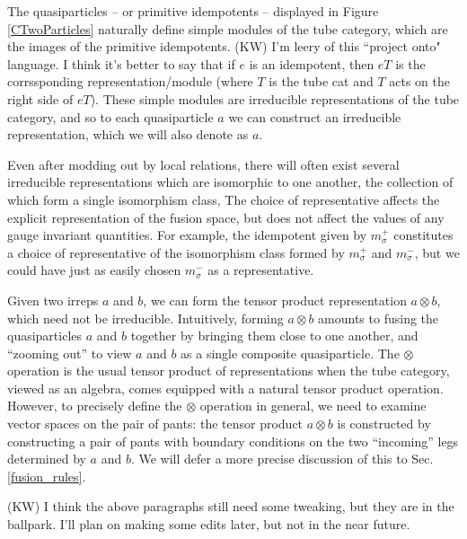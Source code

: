 \documentclass[12pt,a4paper]{article}
\newcommand{\tp}{\otimes}
\newcommand{\kw}[1]{{\color{kwcolor}\footnotesize{(KW) #1}}}
\begin{document}
The quasiparticles -- or primitive idempotents -- displayed in Figure \ref{CTwoParticles} naturally define simple modules of the tube category, which are the images of the primitive idempotents.
\kw{I'm leery of this ``project onto" language.
I think it's better to say that if $e$ is an idempotent, then $eT$ is the corrssponding
representation/module (where $T$ is the tube cat and $T$ acts on the right side of $eT$).}
These simple modules are irreducible representations 
of the tube category, and so to each quasiparticle $a$ we can construct an irreducible representation, which we will also denote as $a$. 

Even after modding out by local relations, there will often exist several irreducible representations which are isomorphic to one another, the collection of which form a single isomorphism class, 
The choice of representative affects the explicit representation of the fusion space, but does not affect the values of any gauge invariant quantities. 
For example, the idempotent given by ${m_\sigma^+}$ constitutes a choice of representative of the isomorphism class formed by $m_\sigma^+$ and $m_\sigma^-$, but we could have just as easily chosen ${m_\sigma^-}$ as a representative.

Given two irreps $a$ and $b$, we can form the tensor product representation $a\tp b$, which need not be irreducible.
Intuitively, forming $a\tp b$ amounts to fusing the quasiparticles $a$ and $b$ together by bringing them close to one another, and ``zooming out'' to view $a$ and $b$ as a single composite quasiparticle. 
The $\tp$ operation is the usual tensor product of representations when the tube category, viewed as an algebra, comes equipped with a natural tensor product operation. 
However, to precisely define the $\tp$ operation in general, we need to examine vector spaces on the pair of pants: the tensor product $a \tp b$ is constructed by constructing a pair of pants with 
boundary conditions on the two ``incoming'' legs determined by $a$ and $b$.
We will defer a more precise discussion of this to Sec. \ref{fusion_rules}. 

\kw{I think the above paragraphs still need some tweaking, but they are in the ballpark.
I'll plan on making some edits later, but not in the near future.}
\end{document}
